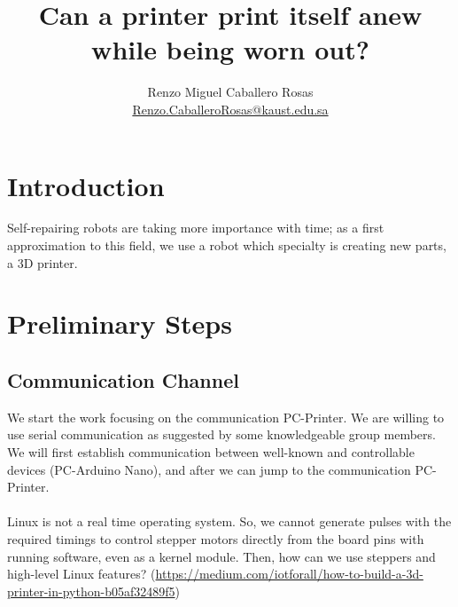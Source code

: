 \documentclass[12pt]{article}
\theoremstyle{definition}
\theoremstyle{remark}
\begin{document}
\title{Can a printer print itself anew while being worn out?}
\author{Renzo Miguel Caballero Rosas\\
\url{Renzo.CaballeroRosas@kaust.edu.sa}} 
\maketitle

\tableofcontents

\section{Introduction}

Self-repairing robots are taking more importance with time; as a first approximation to this field, we use a robot which specialty is creating new parts, a 3D printer.

\section{Preliminary Steps}

\subsection{Communication Channel}

We start the work focusing on the communication PC-Printer. We are willing to use serial communication as suggested by some knowledgeable group members. We will first establish communication between well-known and controllable devices (PC-Arduino Nano), and after we can jump to the communication PC-Printer.\\
\quad\\
Linux is not a real time operating system. So, we cannot generate pulses with the required timings to control stepper motors directly from the board pins with running software, even as a kernel module. Then, how can we use steppers and high-level Linux features? (\url{https://medium.com/iotforall/how-to-build-a-3d-printer-in-python-b05af32489f5})
\end{document}
